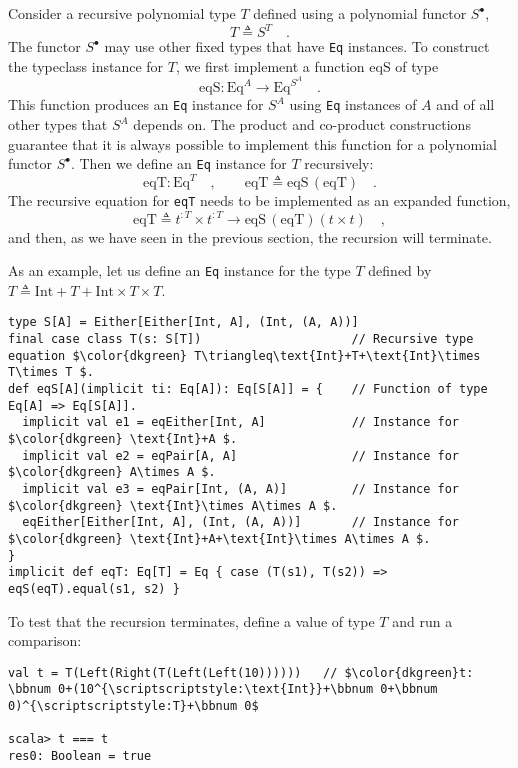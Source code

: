 Consider a recursive polynomial type $T$ defined using a polynomial
functor $S^{\bullet}$,
\[
T\triangleq S^{T}\quad.
\]
The functor $S^{\bullet}$ may use other fixed types that have \lstinline!Eq!
instances. To construct the typeclass instance for $T$, we first
implement a function $\text{eqS}$ of type
\[
\text{eqS}:\text{Eq}^{A}\rightarrow\text{Eq}^{S^{A}}\quad.
\]
This function produces an \lstinline!Eq! instance for $S^{A}$ using
\lstinline!Eq! instances of $A$ and of all other types that $S^{A}$
depends on. The product and co-product constructions guarantee that
it is always possible to implement this function for a polynomial
functor $S^{\bullet}$. Then we define an \lstinline!Eq! instance
for $T$ recursively:
\[
\text{eqT}:\text{Eq}^{T}\quad,\quad\quad\text{eqT}\triangleq\text{eqS}\,(\text{eqT})\quad.
\]
The recursive equation for \lstinline!eqT! needs to be implemented
as an expanded function, 
\[
\text{eqT}\triangleq t^{:T}\times t^{:T}\rightarrow\text{eqS}\,(\text{eqT})\left(t\times t\right)\quad,
\]
and then, as we have seen in the previous section, the recursion will
terminate.

As an example, let us define an \lstinline!Eq! instance for the type
$T$ defined by $T\triangleq\text{Int}+T+\text{Int}\times T\times T$.
\begin{lstlisting}[mathescape=true]
type S[A] = Either[Either[Int, A], (Int, (A, A))]
final case class T(s: S[T])                     // Recursive type equation $\color{dkgreen} T\triangleq\text{Int}+T+\text{Int}\times T\times T $.
def eqS[A](implicit ti: Eq[A]): Eq[S[A]] = {    // Function of type Eq[A] => Eq[S[A]].
  implicit val e1 = eqEither[Int, A]            // Instance for $\color{dkgreen} \text{Int}+A $.
  implicit val e2 = eqPair[A, A]                // Instance for $\color{dkgreen} A\times A $.
  implicit val e3 = eqPair[Int, (A, A)]         // Instance for $\color{dkgreen} \text{Int}\times A\times A $.
  eqEither[Either[Int, A], (Int, (A, A))]       // Instance for $\color{dkgreen} \text{Int}+A+\text{Int}\times A\times A $.
}
implicit def eqT: Eq[T] = Eq { case (T(s1), T(s2)) => eqS(eqT).equal(s1, s2) }
\end{lstlisting}
To test that the recursion terminates, define a value of type $T$
and run a comparison:
\begin{lstlisting}[mathescape=true]
val t = T(Left(Right(T(Left(Left(10))))))   // $\color{dkgreen}t: \bbnum 0+(10^{\scriptscriptstyle:\text{Int}}+\bbnum 0+\bbnum 0)^{\scriptscriptstyle:T}+\bbnum 0$

scala> t === t
res0: Boolean = true
\end{lstlisting}


